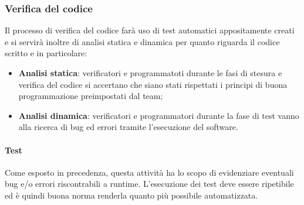 \subsubsection{Verifica del codice}
Il processo di verifica del codice farà uso di test automatici appositamente creati e si servirà inoltre di analisi statica e dinamica per quanto riguarda il codice scritto e in particolare:
\begin{itemize}
    \item \textbf{Analisi statica}: verificatori e programmatoti durante le fasi di stesura e verifica del codice si accertano che siano stati rispettati i principi di buona programmazione preimpostati dal team;
    \item \textbf{Analisi dinamica}: verificatori e programmatori durante la fase di test vanno alla ricerca di bug\glo{} ed errori tramite l'esecuzione del software.
\end{itemize}

\paragraph{Test}
Come esposto in precedenza, questa attività ha lo scopo di evidenziare eventuali bug\glo{} e/o errori riscontrabili a runtime. L'esecuzione dei test deve essere ripetibile ed è quindi buona norma renderla quanto più possibile automatizzata.

